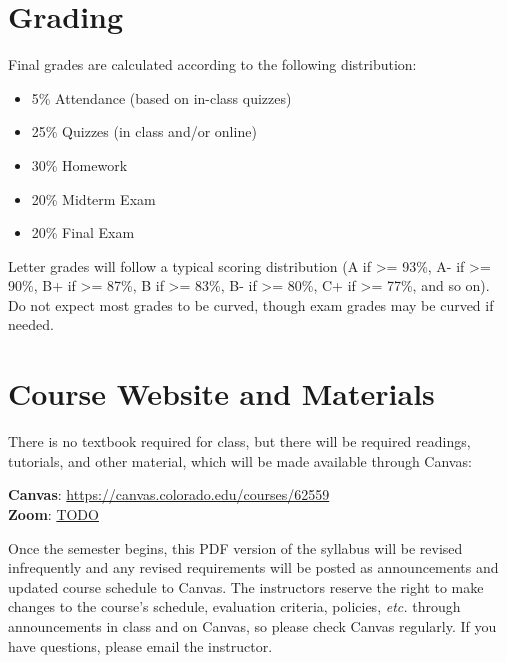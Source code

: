 \documentclass[10pt]{memoir}
\def\myzoomurl{TODO}
\def\mycanvasurl{https://canvas.colorado.edu/courses/62559}
\begin{document}
\section{\textbf{Grading}}

Final grades are calculated according to the following distribution:
\begin{itemize}
\item 5\% Attendance (based on in-class quizzes)
\item 25\% Quizzes (in class and/or online)
\item 30\% Homework
\item 20\% Midterm Exam
\item 20\% Final Exam
\end{itemize}

Letter grades will follow a typical scoring distribution (A if >= 93\%, A- if >= 90\%, B+ if >=
87\%, B if >= 83\%, B- if >= 80\%, C+ if >= 77\%, and so on). Do not expect most grades to be
curved, though exam grades may be curved if needed.


\section{\textbf{Course Website and Materials}}
There is no textbook required for class, but there will be required readings, tutorials, and other material, which will be made available through Canvas:
\vspace{-8pt}
    \begin{center}
    \Large{\textbf{Canvas}: \href{\mycanvasurl}{\mycanvasurl}}\\
    \Large{\textbf{Zoom}: \href{\myzoomurl}{\myzoomurl}}
    \end{center}
\vspace{-8pt}
Once the semester begins, this PDF version of the syllabus will be revised infrequently and any revised requirements will be posted as announcements and updated course schedule to Canvas. The instructors reserve the right to make changes to the course's schedule, evaluation criteria, policies, \textit{etc.} through announcements in class and on Canvas, so please check Canvas regularly. If you have questions, please email the instructor.
\end{document}

